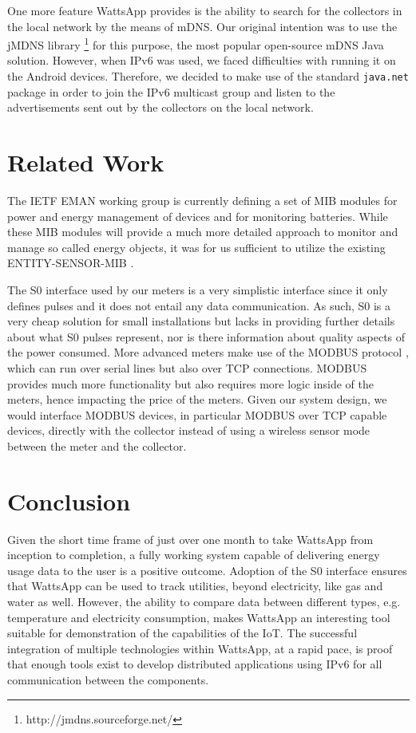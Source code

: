 \documentclass[10pt, conference, compsocconf, english]{IEEEtran}
\begin{document}
One more feature WattsApp provides is the ability to search for the
collectors in the local network by the means of mDNS. Our original
intention was to use the jMDNS library%
\footnote{http://jmdns.sourceforge.net/%
} for this purpose, the most popular open-source mDNS Java solution.
However, when IPv6 was used, we faced difficulties with running it
on the Android devices. Therefore, we decided to make use of the standard
\verb=java.net= package in order to join the IPv6 multicast group
and listen to the advertisements sent out by the collectors on the
local network.


\section{Related Work}

The IETF EMAN working group is currently defining a set of MIB modules
for power and energy management of devices and for monitoring batteries.
While these MIB modules will provide a much more detailed approach
to monitor and manage so called energy objects, it was for us sufficient
to utilize the existing ENTITY-SENSOR-MIB \cite{rfc3433}.

The S0 interface \cite{iec62053-31} used by our meters is a very
simplistic interface since it only defines pulses and it does not
entail any data communication. As such, S0 is a very cheap solution
for small installations but lacks in providing further details about
what S0 pulses represent, nor is there information about quality aspects
of the power consumed. More advanced meters make use of the MODBUS
protocol \cite{iec61158}, which can run over serial lines but also
over TCP connections. MODBUS provides much more functionality but
also requires more logic inside of the meters, hence impacting the
price of the meters. Given our system design, we would interface MODBUS
devices, in particular MODBUS over TCP capable devices, directly with
the collector instead of using a wireless sensor mode between the meter and the collector.


\section{Conclusion}

Given the short time frame of just over one month to take WattsApp
from inception to completion, a fully working system capable of delivering
energy usage data to the user is a positive outcome. Adoption of the S0 interface ensures that WattsApp can be used to track utilities, beyond electricity, like gas and water as well. However, the ability to compare
data between different types, e.g. temperature and electricity consumption,
makes WattsApp an interesting tool suitable for demonstration of the
capabilities of the IoT. The successful integration
of multiple technologies within WattsApp, at a rapid pace, is proof
that enough tools exist to develop distributed applications using
IPv6 for all communication between the components.
\end{document}
